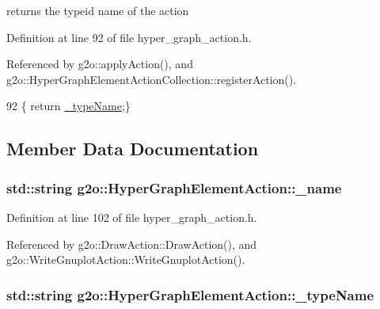 returns the typeid name of the action 



Definition at line 92 of file hyper\+\_\+graph\+\_\+action.\+h.



Referenced by g2o\+::apply\+Action(), and g2o\+::\+Hyper\+Graph\+Element\+Action\+Collection\+::register\+Action().


\begin{DoxyCode}
92 \{ \textcolor{keywordflow}{return} \hyperlink{classg2o_1_1HyperGraphElementAction_ae05082e218d213f8db5de7a79769f97c}{\_typeName};\}
\end{DoxyCode}


\subsection{Member Data Documentation}
\subsubsection[{\texorpdfstring{\+\_\+name}{_name}}]{\setlength{\rightskip}{0pt plus 5cm}std\+::string g2o\+::\+Hyper\+Graph\+Element\+Action\+::\+\_\+name\hspace{0.3cm}{\ttfamily [protected]}}\hypertarget{classg2o_1_1HyperGraphElementAction_a31245b0a79dfb357e3b345ff57b7b491}{}\label{classg2o_1_1HyperGraphElementAction_a31245b0a79dfb357e3b345ff57b7b491}


Definition at line 102 of file hyper\+\_\+graph\+\_\+action.\+h.



Referenced by g2o\+::\+Draw\+Action\+::\+Draw\+Action(), and g2o\+::\+Write\+Gnuplot\+Action\+::\+Write\+Gnuplot\+Action().

\subsubsection[{\texorpdfstring{\+\_\+type\+Name}{_typeName}}]{\setlength{\rightskip}{0pt plus 5cm}std\+::string g2o\+::\+Hyper\+Graph\+Element\+Action\+::\+\_\+type\+Name\hspace{0.3cm}{\ttfamily [protected]}}\hypertarget{classg2o_1_1HyperGraphElementAction_ae05082e218d213f8db5de7a79769f97c}{}\label{classg2o_1_1HyperGraphElementAction_ae05082e218d213f8db5de7a79769f97c}


